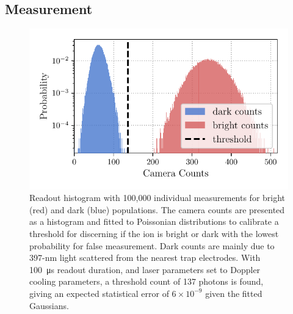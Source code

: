\subsection{Measurement}
\label{sec:Measurement}
    \begin{figure}
        \begin{center}
        \noindent\includegraphics[width=0.75\linewidth]{
            figures/pdf_figure/readout_hist.pdf
            }
        \end{center}
        \caption{
            Readout histogram with 100,000 individual measurements for bright (red) and dark (blue) populations. The camera counts are presented as a histogram and fitted to Poissonian distributions to calibrate a threshold for discerning if the ion is bright or dark with the lowest probability for false measurement. Dark counts are mainly due to 397-nm light scattered from the nearest trap electrodes. With 100~\unit{\us} readout duration, and laser parameters set to Doppler cooling parameters, a threshold count of 137 photons is found, giving an expected statistical error of $6\times 10^{-9}$ given the fitted Gaussians. %
            }
        \label{fig:readout_histogram}
    \end{figure}

